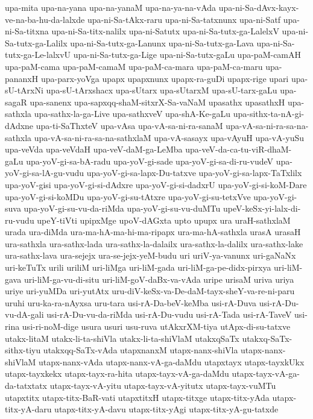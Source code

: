 {upa-mita
upa-na-yana
upa-na-yanaM
upa-na-ya-na-vAda
upa-ni-Sa-dAvx-kayx-ve-na-ba-hu-da-lalxde
upa-ni-Sa-tAkx-raru
upa-ni-Sa-tatxnunx
upa-ni-Satf
upa-ni-Sa-titxna
upa-ni-Sa-titx-nalilx
upa-ni-Satutx
upa-ni-Sa-tutx-ga-LalelxV
upa-ni-Sa-tutx-ga-Lalilx
upa-ni-Sa-tutx-ga-Lanunx
upa-ni-Sa-tutx-ga-Lava
upa-ni-Sa-tutx-ga-Le-lalxvU
upa-ni-Sa-tutx-ga-Lige
upa-ni-Sa-tutx-gaLu
upa-paM-camAH
upa-paM-cama
upa-paM-camaM
upa-paM-ca-mara
upa-paM-ca-maru
upa-pananxH
upa-parx-yoVga
upapx
upapxnunx
upapx-ra-guDi
upapx-rige
upari
upa-sU-tArxNi
upa-sU-tArxshacx
upa-sUtarx
upa-sUtarxM
upa-sU-tarx-gaLu
upa-sagaR
upa-sanenx
upa-sapxqq-shaM-sitxrX-Sa-vaNaM
upasathx
upasathxH
upa-sathxla
upa-sathx-la-ga-Live
upa-sathxveV
upa-shA-Ke-gaLu
upa-sithx-ta-nA-gi-dAdxne
upa-ti-SaThxteV
upa-vAsa
upa-vA-sa-ni-ra-sanaM
upa-vA-sa-ni-ra-sa-na-sathxla
upa-vA-sa-ni-ra-sa-na-sathxlaM
upa-vA-sasayx
upa-vAyuH
upa-vA-yuSu
upa-veVda
upa-veVdaH
upa-veV-daM-ga-LeMba
upa-veV-da-ca-tu-viR-dhaM-gaLu
upa-yoV-gi-sa-bA-radu
upa-yoV-gi-sade
upa-yoV-gi-sa-di-ru-vudeV
upa-yoV-gi-sa-lA-gu-vudu
upa-yoV-gi-sa-lapx-Du-tatxve
upa-yoV-gi-sa-lapx-TaTxlilx
upa-yoV-gisi
upa-yoV-gi-si-dAdxre
upa-yoV-gi-si-dadxrU
upa-yoV-gi-si-koM-Dare
upa-yoV-gi-si-koMDu
upa-yoV-gi-su-tAtxre
upa-yoV-gi-su-tetxVve
upa-yoV-gi-suva
upa-yoV-gi-su-vu-da-riMda
upa-yoV-gi-su-vu-duMTu
upeV-keSx-yi-lalx-di-ru-vudu
upeY-tiVti
upipxMge
upoV-dAGxta
upto
upupx
ura
uraH-sathxlaM
urada
ura-diMda
ura-ma-hA-ma-hi-ma-ripapx
ura-ma-hA-sathxla
urasA
urasaH
ura-sathxla
ura-sathx-lada
ura-sathx-la-dalailx
ura-sathx-la-dalilx
ura-sathx-lake
ura-sathx-lava
ura-sejejx
ura-se-jejx-yeM-budu
uri
uriV-ya-vanunx
uri-gaNaNx
uri-keTuTx
urili
uriliM
uri-liMga
uri-liM-gada
uri-liM-ga-pe-didx-pirxya
uri-liM-gava
uri-liM-ga-vu-di-situ
uri-liM-goV-daBx-va-vAda
uripe
urisaM
uriva
uriya
uriye
uri-yuMDa
uri-yutAtx
uru-diV-keSx-va-De-daM-tayx-sheY-va-re-ni-paru
uruhi
uru-ka-ra-nAyxsa
uru-tara
usi-rA-Da-beV-keMba
usi-rA-Duva
usi-rA-Du-vu-dA-gali
usi-rA-Du-vu-da-riMda
usi-rA-Du-vudu
usi-rA-Tada
usi-rA-TaveV
usi-rina
usi-ri-noM-dige
usura
usuri
usu-ruva
utAkxrXM-tiya
utApx-di-su-tatxve
utakx-litaM
utakx-li-ta-shiVla
utakx-li-ta-shiVlaM
utakxqSaTx
utakxq-SaTx-sithx-tiyu
utakxqq-SaTx-vAda
utapxnanxM
utapx-nanx-shiVla
utapx-nanx-shiVlaM
utapx-nanx-vAda
utapx-nanx-vA-ga-daMdu
utapxtayx
utapx-tayxkUkx
utapx-tayxkekx
utapx-tayx-ra-hita
utapx-tayx-vA-ga-daMdu
utapx-tayx-vA-ga-da-tatxtatx
utapx-tayx-vA-yitu
utapx-tayx-vA-yitutx
utapx-tayx-vuMTu
utapxtitx
utapx-titx-BaR-vati
utapxtitxH
utapx-titxge
utapx-titx-yAda
utapx-titx-yA-daru
utapx-titx-yA-davu
utapx-titx-yAgi
utapx-titx-yA-gu-tatxde
}
